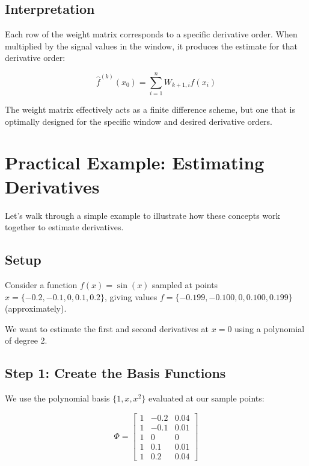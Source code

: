 \documentclass{article}
\begin{document}
\subsection{Interpretation}

Each row of the weight matrix corresponds to a specific derivative order. When multiplied by the signal values in the window, it produces the estimate for that derivative order:

\begin{equation}
\hat{f}^{(k)}(x_0) = \sum_{i=1}^n W_{k+1,i} f(x_i)
\end{equation}

The weight matrix effectively acts as a finite difference scheme, but one that is optimally designed for the specific window and desired derivative orders.

\section{Practical Example: Estimating Derivatives}

Let's walk through a simple example to illustrate how these concepts work together to estimate derivatives.

\subsection{Setup}

Consider a function $f(x) = \sin(x)$ sampled at points $x = \{-0.2, -0.1, 0, 0.1, 0.2\}$, giving values $f = \{-0.199, -0.100, 0, 0.100, 0.199\}$ (approximately).

We want to estimate the first and second derivatives at $x = 0$ using a polynomial of degree 2.

\subsection{Step 1: Create the Basis Functions}

We use the polynomial basis $\{1, x, x^2\}$ evaluated at our sample points:

\begin{equation}
\Phi = \begin{bmatrix}
1 & -0.2 & 0.04 \\
1 & -0.1 & 0.01 \\
1 & 0 & 0 \\
1 & 0.1 & 0.01 \\
1 & 0.2 & 0.04
\end{bmatrix}
\end{equation}
\end{document}

